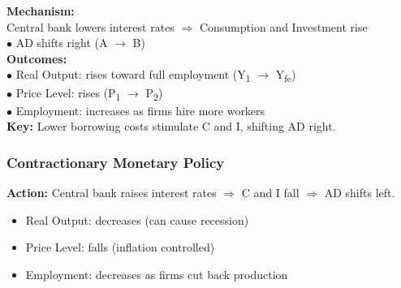 \documentclass[11pt, a4paper, twoside]{book}
\begin{document}
\begin{diagrambox}
{%
}{%
\textbf{\color{NavyPrimary}Mechanism:}\\[4pt]
Central bank lowers interest rates $\Rightarrow$ Consumption and Investment rise\\[2pt]
$\bullet$ AD shifts right (A $\to$ B)\\[4pt]
\textbf{\color{NavyPrimary}Outcomes:}\\[2pt]
$\bullet$ Real Output: rises toward full employment (Y\textsubscript{1} $\to$ Y\textsubscript{fe})\\[2pt]
$\bullet$ Price Level: rises (P\textsubscript{1} $\to$ P\textsubscript{2})\\[2pt]
$\bullet$ Employment: increases as firms hire more workers\\[4pt]
\textbf{\color{GoldAccent}Key:} Lower borrowing costs stimulate C and I, shifting AD right.%
}
\end{diagrambox}

\subsubsection{Contractionary Monetary Policy}

\textbf{Action:} Central bank raises interest rates $\Rightarrow$ C and I fall $\Rightarrow$ AD shifts left.

\begin{itemize}
  \item Real Output: decreases (can cause recession)
  \item Price Level: falls (inflation controlled)
  \item Employment: decreases as firms cut back production
\end{itemize}
\end{document}
